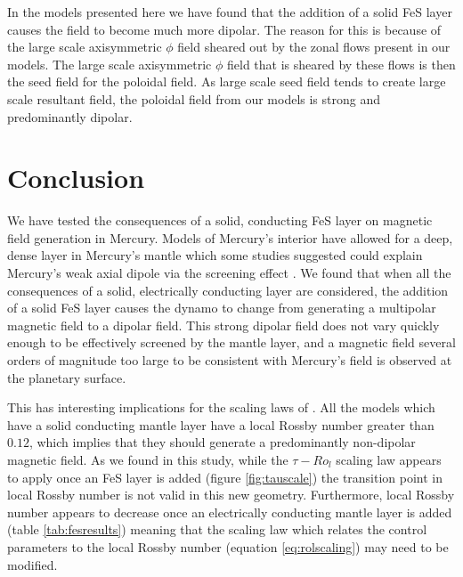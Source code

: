 In the models presented here we have found that the addition of a solid FeS layer causes the field to become much more dipolar. The reason for this is because of the large scale axisymmetric $\phi$ field sheared out by the zonal flows present in our models. The large scale axisymmetric $\phi$ field that is sheared by these flows is then the seed field for the poloidal field. As large scale seed field tends to create large scale resultant field, the poloidal field from our models is strong and predominantly dipolar.

\section{Conclusion}
We have tested the consequences of a solid, conducting FeS layer on magnetic field generation in Mercury. Models of Mercury's interior have allowed for a deep, dense layer in Mercury's mantle which some studies \citep{smith2012, hauck2013} suggested could explain Mercury's weak axial dipole via the screening effect \citep{christensen06}. We found that when all the consequences of a solid, electrically conducting layer are considered, the addition of a solid FeS layer causes the dynamo to change from generating a multipolar magnetic field to a dipolar field. This strong dipolar field does not vary quickly enough to be effectively screened by the mantle layer, and a magnetic field several orders of magnitude too large to be consistent with Mercury's field is observed at the planetary surface.

This has interesting implications for the scaling laws of \citet{christensen06scaling}. All the models which have a solid conducting mantle layer have a local Rossby number greater than $0.12$, which implies that they should generate a predominantly non-dipolar magnetic field. As we found in this study, while the $\tau-Ro_l$ scaling law appears to apply once an FeS layer is added (figure \ref{fig:tauscale}) the transition point in local Rossby number is not valid in this new geometry. Furthermore, local Rossby number appears to decrease once an electrically conducting mantle layer is added (table \ref{tab:fesresults}) meaning that the scaling law which relates the control parameters to the local Rossby number (equation \ref{eq:rolscaling}) may need to be modified. 

